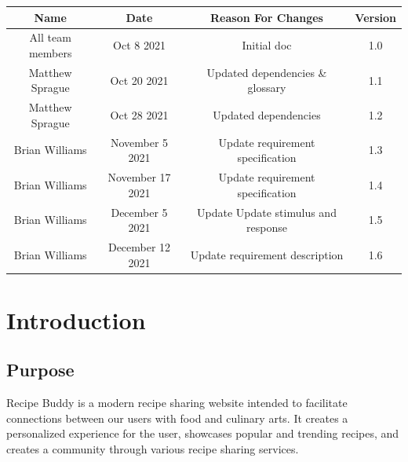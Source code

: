 \documentclass{scrreprt}
\begin{document}
\begin{center}
    \begin{tabular}{c c c c}
        \midrule
        Name             & Date       & Reason For Changes & Version \\
        \midrule
        All team members & Oct 8 2021 & Initial doc        & 1.0     \\
        \midrule
        Matthew Sprague
                         & Oct 20 2021
                         & Updated dependencies \& glossary
                         & 1.1                                       \\
        Matthew Sprague
                         & Oct 28 2021
                         & Updated dependencies
                         & 1.2                                       \\
        \midrule
        
        Brian Williams
                         & November 5 2021
                         & Update requirement specification
                         & 1.3                                       \\
        
        Brian Williams
                         & November 17 2021
                         & Update requirement specification
                         & 1.4                                       \\
        
        Brian Williams
                         & December 5 2021
                         & Update Update stimulus and response
                         & 1.5                                       \\
        
        Brian Williams
                         & December 12 2021
                         & Update requirement description
                         & 1.6                                       \\
        \midrule
    \end{tabular}
\end{center}

\chapter{Introduction}

\section{Purpose}
$ $\gls{Recipe Buddy} is a modern recipe sharing website intended to facilitate connections between our users with food and culinary arts.
It creates a personalized experience for the user, showcases popular and trending recipes, and creates a community through various recipe sharing services.$ $
\end{document}
